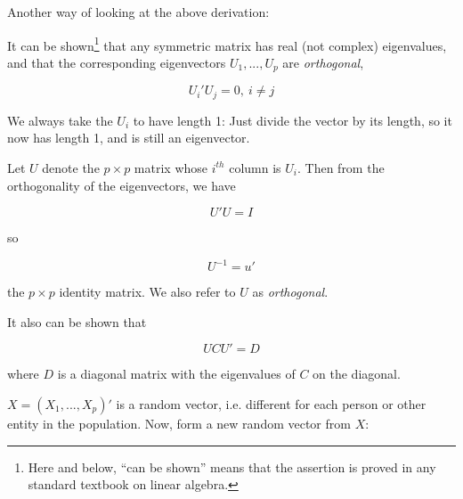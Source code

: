 % 
% 

Another way of looking at the above derivation:

It can be shown\footnote{Here and below, ``can be shown'' means that the
assertion is proved in any standard textbook on linear algebra.} that
any symmetric matrix has real (not complex) eigenvalues, and that the
corresponding eigenvectors $U_1,...,U_p$ are \textit{orthogonal},

\begin{equation}
U_i' U_j = 0, ~ i \neq j
\end{equation}

We always take the $U_i$ to have length 1:  Just divide the vector by
its length, so it now has length 1, and is still an eigenvector.  

Let $U$ denote the $p \times p$ matrix whose $i^{th}$ column is $U_i$.
Then from the orthogonality of the eigenvectors, we have

\begin{equation}
\label{uui}
U'U = I
\end{equation}

so

\begin{equation}
U^{-1} = u'
\end{equation}

the $p \times p$ identity matrix.  We also refer to $U$ as
\emph{orthogonal}.

It also can be shown that 

\begin{equation}
U C U' = D
\end{equation}

where $D$ is a diagonal matrix with the eigenvalues of $C$ on the
diagonal.

% 


$X = (X_1,...,X_p)'$ is a random vector, i.e. different for each person
or other entity in the population.  Now, form a new random vector from
$X$:

